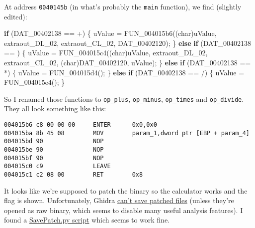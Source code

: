 \documentclass[11pt]{article}
\newenvironment{Shaded}{}{}
\newcommand{\DataTypeTok}[1]{\textcolor[rgb]{0.56,0.13,0.00}{{#1}}}
\newcommand{\CharTok}[1]{\textcolor[rgb]{0.25,0.44,0.63}{{#1}}}
\newcommand{\NormalTok}[1]{{#1}}
\newcommand{\ControlFlowTok}[1]{\textcolor[rgb]{0.00,0.44,0.13}{\textbf{{#1}}}}
\begin{document}
At address \texttt{0040145b} (in what's probably the \texttt{main}
function), we find (slightly edited):

\begin{Shaded}
\begin{Highlighting}[]
\ControlFlowTok{if}\NormalTok{ (DAT\_00402138 == }\CharTok{\textquotesingle{}+\textquotesingle{}}\NormalTok{) \{}
\NormalTok{    uValue = FUN\_004015b6((}\DataTypeTok{char}\NormalTok{)uValue,}
\NormalTok{                          extraout\_DL\_02,}
\NormalTok{                          extraout\_CL\_02,}
\NormalTok{                          DAT\_00402120);}
\NormalTok{\} }\ControlFlowTok{else} \ControlFlowTok{if}\NormalTok{ (DAT\_00402138 == }\CharTok{\textquotesingle{}{-}\textquotesingle{}}\NormalTok{) \{}
\NormalTok{    uValue = FUN\_004015c4((}\DataTypeTok{char}\NormalTok{)uValue,}
\NormalTok{                          extraout\_DL\_02,}
\NormalTok{                          extraout\_CL\_02,}
\NormalTok{                          (}\DataTypeTok{char}\NormalTok{)DAT\_00402120,}
\NormalTok{                          uValue);}
\NormalTok{\} }\ControlFlowTok{else} \ControlFlowTok{if}\NormalTok{ (DAT\_00402138 == }\CharTok{\textquotesingle{}*\textquotesingle{}}\NormalTok{) \{}
\NormalTok{    uValue = FUN\_004015d4();}
\NormalTok{\} }\ControlFlowTok{else} \ControlFlowTok{if}\NormalTok{ (DAT\_00402138 == }\CharTok{\textquotesingle{}/\textquotesingle{}}\NormalTok{) \{}
\NormalTok{    uValue = FUN\_004015e4();}
\NormalTok{\}}
\end{Highlighting}
\end{Shaded}

So I renamed those functions to \texttt{op\_plus}, \texttt{op\_minus},
\texttt{op\_times} and \texttt{op\_divide}. They all look something like
this:

\begin{verbatim}
004015b6 c8 00 00 00     ENTER      0x0,0x0
004015ba 8b 45 08        MOV        param_1,dword ptr [EBP + param_4]
004015bd 90              NOP
004015be 90              NOP
004015bf 90              NOP
004015c0 c9              LEAVE
004015c1 c2 08 00        RET        0x8
\end{verbatim}

It looks like we're supposed to patch the binary so the calculator works
and the flag is shown. Unfortunately, Ghidra
\href{https://github.com/NationalSecurityAgency/ghidra/issues/19}{can't
save patched files} (unless they're opened as raw binary, which seems to
disable many useful analysis features). I found a
\href{https://github.com/schlafwandler/ghidra_SavePatch}{SavePatch.py
script} which seems to work fine.
\end{document}
